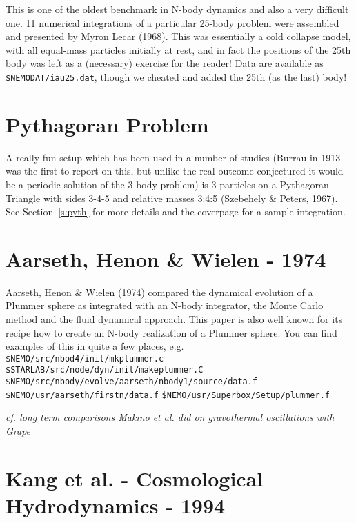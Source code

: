 {This is one of the oldest benchmark in N-body dynamics and also a
very difficult one.
11 numerical integrations of a particular
25-body problem were assembled and presented
by Myron Lecar (1968).
This was essentially a cold collapse model, with all equal-mass 
particles initially at rest, and
in fact the positions of the 25th body was left as a (necessary)
exercise for the reader!
Data are available as {\tt \$NEMODAT/iau25.dat}, though we 
cheated and added the 25th (as the last) body!

\section{Pythagoran Problem}

A really fun setup which has been used in a number of studies
(Burrau in 1913 was the first to report on this,
but unlike the real outcome conjectured it would be 
a periodic solution of the 3-body problem)
is 3 particles on a Pythagoran Triangle with sides 3-4-5 
and relative masses 3:4:5 (Szebehely \& Peters, 1967).
See Section~\ref{s:pyth} for more details and the
coverpage for a sample integration.



\section{Aarseth, Henon \& Wielen - 1974}

Aarseth, Henon \& Wielen (1974) compared the dynamical evolution of a 
Plummer sphere as integrated with an N-body integrator,
the Monte Carlo method and the fluid dynamical approach.
This paper is also well known for its recipe how to create
an N-body realization of a Plummer sphere. You can find examples
of this in quite a few places, e.g.\\
{\tt \$NEMO/src/nbod4/init/mkplummer.c}\\
{\tt \$STARLAB/src/node/dyn/init/makeplummer.C}\\
{\tt \$NEMO/src/nbody/evolve/aarseth/nbody1/source/data.f}\\
{\tt \$NEMO/usr/aarseth/firstn/data.f}
{\tt \$NEMO/usr/Superbox/Setup/plummer.f}


{\it cf. long term comparisons Makino et al. did on gravothermal oscillations with Grape}

\section{Kang et al. - Cosmological Hydrodynamics - 1994}


}
